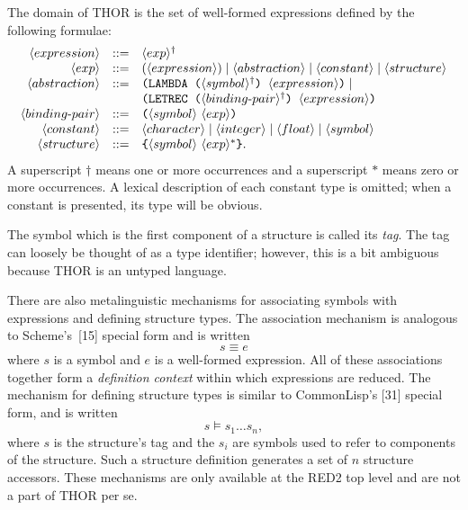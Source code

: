 The domain of THOR is the set of well-formed expressions defined by the
following formulae:
\[
\begin{array}{rcl}
\langle expression\rangle &::=& \langle exp\rangle^\dagger\\
\langle exp\rangle &::=& (\langle expression\rangle) \mid
  \langle abstraction\rangle \mid \langle constant\rangle \mid
  \langle structure\rangle\\
\langle abstraction\rangle &::=&
  \texttt{(LAMBDA (}\langle symbol\rangle^\dagger\texttt{) }
  \langle expression\rangle\texttt{)} \mid{}\\
&& \texttt{(LETREC (}\langle binding\text{-}pair\rangle^\dagger\texttt{) }
  \langle expression\rangle\texttt{)}\\
\langle binding\text{-}pair\rangle &::=&
  \texttt{(}\langle symbol\rangle\ \langle exp\rangle\texttt{)}\\
\langle constant\rangle &::=&
  \langle character\rangle \mid \langle integer\rangle \mid
  \langle float\rangle \mid \langle symbol\rangle\\
\langle structure\rangle &::=&
  \texttt{\{}\langle symbol\rangle\ \langle exp\rangle^*\texttt{\}}.
\end{array}
\]
A superscript \(\dagger\) means one or more occurrences and a superscript
\(*\) means zero or more occurrences. A lexical description of each constant
type is omitted; when a constant is presented, its type will be obvious.

The symbol which is the first component of a structure is called its \emph{tag}. The
tag can loosely be thought of as a type identifier; however, this is a bit
ambiguous because THOR is an untyped language.

There are also metalinguistic mechanisms for associating symbols with
expressions and defining structure types. The association mechanism is analogous
to Scheme's~[15]  special form and is written
\[
s \equiv e
\]
where \(s\) is a symbol and \(e\) is a well-formed expression. All of these
associations together form a \emph{definition context} within which expressions are
reduced. The mechanism for defining structure types is similar to CommonLisp's
[31]  special form, and is written
\[
s \vDash s_1\ldots s_n,
\]
where \(s\) is the structure's tag and the \(s_i\) are symbols used to refer to
components of the structure. Such a structure definition generates a set of
\(n\) structure accessors. These mechanisms are only available at the RED2 top
level and are not a part of THOR per se.

